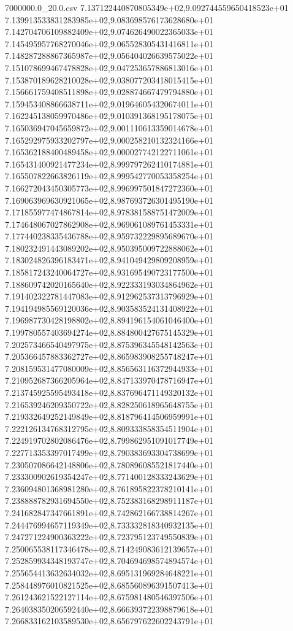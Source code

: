 \begin{filecontents*}{7000000.0_20.0.csv}
7.137122440870805349e+02,9.092744559650418523e+01
7.139913533831283985e+02,9.083698576173628680e+01
7.142704706109882409e+02,9.074626490022365033e+01
7.145495957768270046e+02,9.065528305431416811e+01
7.148287288867365987e+02,9.056404026639575022e+01
7.151078699467478828e+02,9.047253657886813016e+01
7.153870189628210028e+02,9.038077203418015415e+01
7.156661759408511898e+02,9.028874667479794880e+01
7.159453408866638711e+02,9.019646054320674011e+01
7.162245138059970486e+02,9.010391368195178075e+01
7.165036947045659872e+02,9.001110613359014678e+01
7.165292975933202797e+02,9.000258210132324166e+01
7.165362188400489458e+02,9.000027742122711061e+01
7.165431400921477234e+02,8.999797262410174881e+01
7.165507822663826119e+02,8.999542770053358254e+01
7.166272043450305773e+02,8.996997501847272360e+01
7.169063969630921065e+02,8.987693726301495190e+01
7.171855977474867814e+02,8.978381588751472009e+01
7.174648067027862908e+02,8.969061089761453331e+01
7.177440238335436788e+02,8.959732229895689670e+01
7.180232491443089202e+02,8.950395009722888062e+01
7.183024826396183471e+02,8.941049429809208959e+01
7.185817243240064727e+02,8.931695490723177500e+01
7.188609742020165640e+02,8.922333193034864962e+01
7.191402322781447083e+02,8.912962537313796929e+01
7.194194985569120036e+02,8.903583524131408922e+01
7.196987730428198802e+02,8.894196154061046400e+01
7.199780557403694274e+02,8.884800427675145329e+01
7.202573466540497975e+02,8.875396345548142563e+01
7.205366457883362727e+02,8.865983908255748247e+01
7.208159531477080009e+02,8.856563116372944933e+01
7.210952687366205964e+02,8.847133970478716947e+01
7.213745925595493418e+02,8.837696471149320132e+01
7.216539246209350722e+02,8.828250618965648755e+01
7.219332649252149849e+02,8.818796414506959991e+01
7.222126134768312795e+02,8.809333858354511904e+01
7.224919702802086476e+02,8.799862951091017749e+01
7.227713353397017499e+02,8.790383693304738699e+01
7.230507086642148806e+02,8.780896085521817440e+01
7.233300902619354247e+02,8.771400128333243629e+01
7.236094801368981280e+02,8.761895822378210141e+01
7.238888782931694550e+02,8.752383168298911187e+01
7.241682847347661891e+02,8.742862166738814267e+01
7.244476994657119349e+02,8.733332818340932135e+01
7.247271224900363222e+02,8.723795123749550839e+01
7.250065538117346478e+02,8.714249083612139657e+01
7.252859934348193747e+02,8.704694698574894574e+01
7.255654413632634032e+02,8.695131969284648221e+01
7.258448976010821525e+02,8.685560896391507413e+01
7.261243621522127114e+02,8.675981480546397506e+01
7.264038350206592440e+02,8.666393722398879618e+01
7.266833162103589530e+02,8.656797622602243791e+01

\end{filecontents*}
